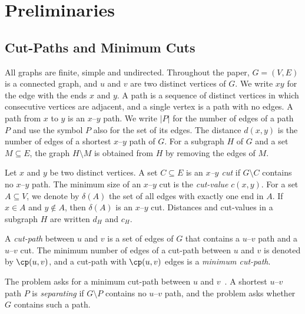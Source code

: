 
\section{Preliminaries}
\label{sec:preliminaries}

\subsection{Cut-Paths and Minimum Cuts}
\label{sec:cut-paths}

All graphs are finite, simple and undirected.
Throughout the paper, $G = (V, E)$ is a connected graph, and $u$ and $v$ are two distinct vertices of $G$.
We write $xy$ for the edge with the ends $x$ and $y$.
A path is a sequence of distinct vertices in which consecutive vertices are adjacent, and a single vertex is a path with no edges.
A path from $x$ to $y$ is an $x$--$y$ path.
We write $|P|$ for the number of edges of a path $P$ and use the symbol $P$ also for the set of its edges.
The distance $d(x, y)$ is the number of edges of a shortest $x$--$y$ path of $G$.
For a subgraph $H$ of $G$ and a set $M \subseteq E$, the graph $H \setminus M$ is obtained from $H$ by removing the edges of $M$.

Let $x$ and $y$ be two distinct vertices.
A set $C \subseteq E$ is an \emph{$x$--$y$ cut} if $G \setminus C$ contains no $x$--$y$ path.
The minimum size of an $x$--$y$ cut is the \emph{cut-value} $c(x, y)$.
For a set $A \subseteq V$, we denote by $\delta(A)$ the set of all edges with exactly one end in $A$.
If $x \in A$ and $y \notin A$, then $\delta(A)$ is an $x$--$y$ cut.
Distances and cut-values in a subgraph $H$ are written $d_H$ and $c_H$.

\begin{definition}
\label{def:cut-path}
A \emph{cut-path} between $u$ and $v$ is a set of edges of $G$ that contains a $u$--$v$ path and a $u$--$v$ cut.
The minimum number of edges of a cut-path between $u$ and $v$ is denoted by $\cp(u, v)$, and a cut-path with $\cp(u, v)$ edges is a \emph{minimum cut-path}.
\end{definition}

The \MinCutPath{} problem asks for a minimum cut-path between $u$ and $v$~\cite{Michel2026MinCutPath}.
A shortest $u$--$v$ path $P$ is \emph{separating} if $G \setminus P$ contains no $u$--$v$ path, and the \SSP{} problem asks whether $G$ contains such a path.

